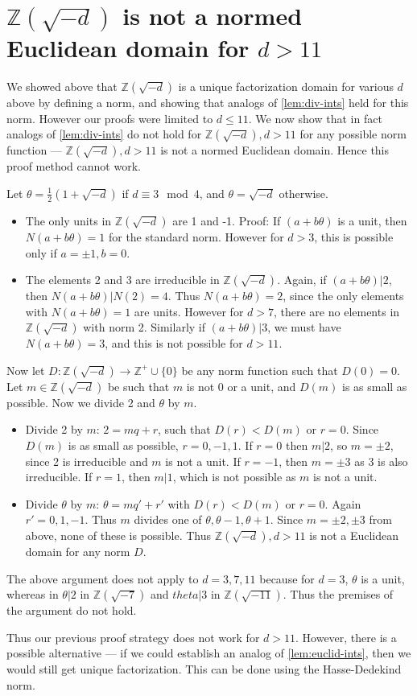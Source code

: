 \documentclass[12pt]{article}
\newcommand{\ints}{{\mathbb{Z}}}
\begin{document}
\section{$\ints(\sqrt{-d})$ is not a normed Euclidean domain for $d > 11$}

We showed above that $\ints(\sqrt{-d})$ is a unique factorization domain for various $d$ above by defining a norm, and showing that analogs of \cref{lem:div-ints} held for this norm.  However our proofs were limited to $d \leq 11$.  We now show that in fact analogs of \cref{lem:div-ints} do not hold for $\ints(\sqrt{-d}), d > 11$ for any possible norm function --- $\ints(\sqrt{-d}), d > 11$ is not a normed Euclidean domain.  Hence this proof method cannot work.

Let $\theta = \frac{1}{2}(1 + \sqrt{-d})$ if $d \equiv 3 \mod 4$, and $\theta = \sqrt{-d}$ otherwise.
\begin{itemize}
\item The only units in $\ints(\sqrt{-d})$ are 1 and -1. Proof: If $(a + b\theta)$ is a unit, then $N(a + b\theta) = 1$ for the standard norm.  However for $d > 3$, this is possible only if $a = \pm 1, b = 0$.
\item The elements 2 and 3 are irreducible in $\ints(\sqrt{-d})$. Again, if $(a + b\theta) | 2$, then $N(a + b\theta) | N(2) = 4$. Thus $N(a + b\theta) = 2$, since the only elements with $N(a + b\theta) = 1$ are units. However for $d > 7$, there are no elements in $\ints(\sqrt{-d})$ with norm 2.  Similarly if $(a + b\theta) | 3$, we must have $N(a + b\theta) = 3$, and this is not possible for $d > 11$.
\end{itemize}
Now let $D: \ints(\sqrt{-d}) \to \ints^+ \cup \{0\}$ be any norm function such that $D(0) = 0$.  Let $m \in  \ints(\sqrt{-d})$ be such that $m$ is not 0 or a unit, and $D(m)$ is as small as possible. Now we divide 2 and $\theta$ by $m$.
\begin{itemize}
\item Divide 2 by $m$: $2 = mq + r$, such that $D(r) < D(m)$ or $r = 0$.  Since $D(m)$ is as small as possible, $r = 0, -1, 1$. If $r = 0$ then $m | 2$, so $m = \pm 2$, since 2 is irreducible and $m$ is not a unit. If $r = -1$, then $m = \pm 3$ as 3 is also irreducible. If $r = 1$, then $m | 1$, which is not possible as $m$ is not a unit.
\item Divide $\theta$ by $m$: $\theta = mq' + r'$ with $D(r) < D(m)$ or $r = 0$. Again $r' = 0, 1, -1$. Thus $m$ divides one of $\theta, \theta -1, \theta + 1$. Since $m = \pm 2, \pm 3$ from above, none of these is possible. Thus $\ints(\sqrt{-d}), d > 11$ is not a Euclidean domain for any norm $D$.
\end{itemize}

The above argument does not apply to $d = 3, 7, 11$ because for $d = 3$, $\theta$ is a unit, whereas in $\theta | 2$ in $\ints(\sqrt{-7})$ and $theta | 3$ in $\ints(\sqrt{-11})$. Thus the premises of the argument do not hold.

Thus our previous proof strategy does not work for $d > 11$. However, there is a possible alternative --- if we could establish an analog of \cref{lem:euclid-ints}, then we would still get unique factorization. This can be done using the Hasse-Dedekind norm.
\end{document}
